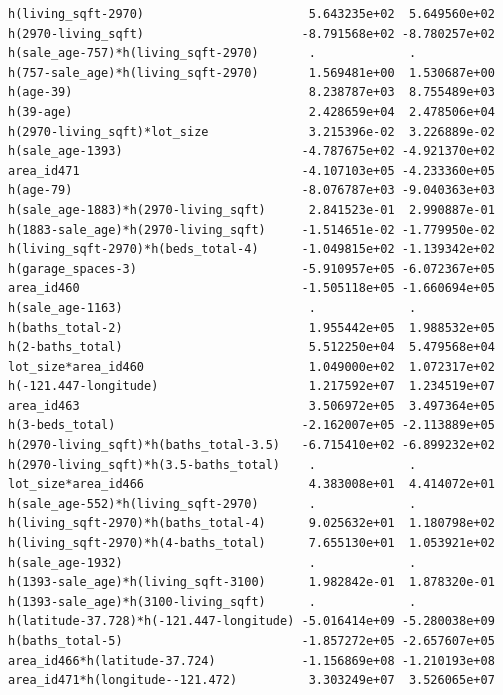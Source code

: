 \documentclass[
]{article}
\begin{document}
\begin{verbatim}
h(living_sqft-2970)                       5.643235e+02  5.649560e+02
h(2970-living_sqft)                      -8.791568e+02 -8.780257e+02
h(sale_age-757)*h(living_sqft-2970)       .             .           
h(757-sale_age)*h(living_sqft-2970)       1.569481e+00  1.530687e+00
h(age-39)                                 8.238787e+03  8.755489e+03
h(39-age)                                 2.428659e+04  2.478506e+04
h(2970-living_sqft)*lot_size              3.215396e-02  3.226889e-02
h(sale_age-1393)                         -4.787675e+02 -4.921370e+02
area_id471                               -4.107103e+05 -4.233360e+05
h(age-79)                                -8.076787e+03 -9.040363e+03
h(sale_age-1883)*h(2970-living_sqft)      2.841523e-01  2.990887e-01
h(1883-sale_age)*h(2970-living_sqft)     -1.514651e-02 -1.779950e-02
h(living_sqft-2970)*h(beds_total-4)      -1.049815e+02 -1.139342e+02
h(garage_spaces-3)                       -5.910957e+05 -6.072367e+05
area_id460                               -1.505118e+05 -1.660694e+05
h(sale_age-1163)                          .             .           
h(baths_total-2)                          1.955442e+05  1.988532e+05
h(2-baths_total)                          5.512250e+04  5.479568e+04
lot_size*area_id460                       1.049000e+02  1.072317e+02
h(-121.447-longitude)                     1.217592e+07  1.234519e+07
area_id463                                3.506972e+05  3.497364e+05
h(3-beds_total)                          -2.162007e+05 -2.113889e+05
h(2970-living_sqft)*h(baths_total-3.5)   -6.715410e+02 -6.899232e+02
h(2970-living_sqft)*h(3.5-baths_total)    .             .           
lot_size*area_id466                       4.383008e+01  4.414072e+01
h(sale_age-552)*h(living_sqft-2970)       .             .           
h(living_sqft-2970)*h(baths_total-4)      9.025632e+01  1.180798e+02
h(living_sqft-2970)*h(4-baths_total)      7.655130e+01  1.053921e+02
h(sale_age-1932)                          .             .           
h(1393-sale_age)*h(living_sqft-3100)      1.982842e-01  1.878320e-01
h(1393-sale_age)*h(3100-living_sqft)      .             .           
h(latitude-37.728)*h(-121.447-longitude) -5.016414e+09 -5.280038e+09
h(baths_total-5)                         -1.857272e+05 -2.657607e+05
area_id466*h(latitude-37.724)            -1.156869e+08 -1.210193e+08
area_id471*h(longitude--121.472)          3.303249e+07  3.526065e+07
                                                                    

\end{verbatim}
\end{document}
